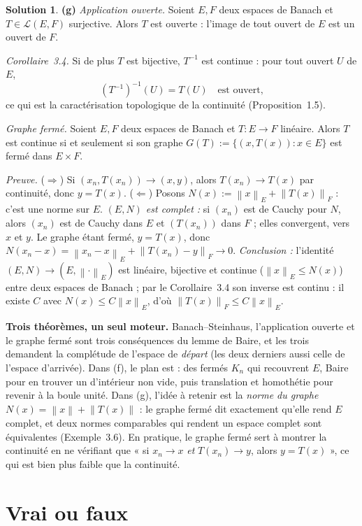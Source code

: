 \documentclass[11pt,a4paper]{article}
\newcommand{\norm}[1]{\left\|#1\right\|}
\newcommand{\Lc}{\mathcal{L}}
\theoremstyle{definition}
\newtheorem*{solution}{Solution}
\begin{document}
\begin{solution}
\medskip
\noindent\textbf{(g)} \emph{Application ouverte.} Soient $E,F$ deux espaces de Banach et $T\in\Lc(E,F)$ surjective. Alors $T$ est ouverte : l'image de tout ouvert de $E$ est un ouvert de $F$.

\emph{Corollaire~3.4.} Si de plus $T$ est bijective, $T^{-1}$ est continue : pour tout ouvert $U$ de $E$,
\[
(T^{-1})^{-1}(U)=T(U)\quad\text{est ouvert,}
\]
ce qui est la caractérisation topologique de la continuité (Proposition~1.5).

\emph{Graphe fermé.} Soient $E,F$ deux espaces de Banach et $T:E\to F$ linéaire. Alors $T$ est continue si et seulement si son graphe $G(T):=\{(x,T(x)):x\in E\}$ est fermé dans $E\times F$.

\emph{Preuve.} ($\Rightarrow$) Si $(x_n,T(x_n))\to(x,y)$, alors $T(x_n)\to T(x)$ par continuité, donc $y=T(x)$. ($\Leftarrow$) Posons $N(x):=\norm x_E+\norm{T(x)}_F$ : c'est une norme sur $E$. \emph{$(E,N)$ est complet :} si $(x_n)$ est de Cauchy pour $N$, alors $(x_n)$ est de Cauchy dans $E$ et $(T(x_n))$ dans $F$ ; elles convergent, vers $x$ et $y$. Le graphe étant fermé, $y=T(x)$, donc $N(x_n-x)=\norm{x_n-x}_E+\norm{T(x_n)-y}_F\to0$. \emph{Conclusion :} l'identité $(E,N)\to(E,\norm\cdot_E)$ est linéaire, bijective et continue ($\norm x_E\le N(x)$) entre deux espaces de Banach ; par le Corollaire~3.4 son inverse est continu : il existe $C$ avec $N(x)\le C\norm x_E$, d'où $\norm{T(x)}_F\le C\norm x_E$.
\end{solution}

\begin{methode}
\textbf{Trois théorèmes, un seul moteur.} Banach--Steinhaus, l'application ouverte et le graphe fermé sont trois conséquences du lemme de Baire, et les trois demandent la complétude de l'espace de \emph{départ} (les deux derniers aussi celle de l'espace d'arrivée). Dans (f), le plan est : des fermés $K_n$ qui recouvrent $E$, Baire pour en trouver un d'intérieur non vide, puis translation et homothétie pour revenir à la boule unité. Dans (g), l'idée à retenir est la \emph{norme du graphe} $N(x)=\norm x+\norm{T(x)}$ : le graphe fermé dit exactement qu'elle rend $E$ complet, et deux normes comparables qui rendent un espace complet sont équivalentes (Exemple~3.6). En pratique, le graphe fermé sert à montrer la continuité en ne vérifiant que « si $x_n\to x$ \emph{et} $T(x_n)\to y$, alors $y=T(x)$ », ce qui est bien plus faible que la continuité.
\end{methode}

\section*{Vrai ou faux}
\end{document}
